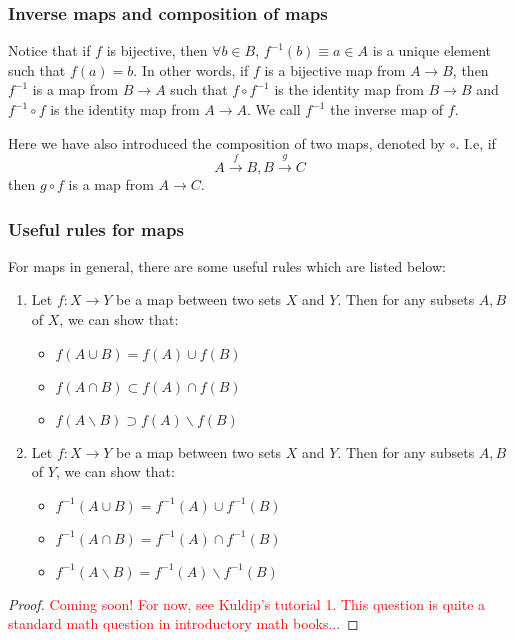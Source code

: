         \subsubsection*{Inverse maps and composition of maps}
          Notice that if $f$ is bijective, then $\forall b \in B$, $f^{-1}(b)
          \equiv a \in A$ is a unique element such that $f(a) = b$. In other
          words, if $f$ is a bijective map from $A \rightarrow B$, then
          $f^{-1}$ is a map from $B \rightarrow A$ such that $f \circ f^{-1}$
          is the identity map from $B \rightarrow B$ and $f^{-1} \circ f$ is
          the identity map from $A \rightarrow A$. We call $f^{-1}$ the inverse
          map of $f$.

          Here we have also introduced the composition of two maps, denoted
          by $\circ$. I.e, if \[A \xrightarrow{f} B, B \xrightarrow{g} C\]
          then $g \circ f$ is a map from $A \rightarrow C$.
        \subsubsection*{Useful rules for maps}
          For maps in general, there are some useful rules which are listed below:
          \begin{enumerate}
            \item{Let $f: X\rightarrow Y$ be a map between two sets $X$ and
            $Y$. Then for any subsets $A,B$ of $X$, we can show that:
            \begin{itemize}
              \item{$f(A \cup B) = f(A) \cup f(B)$}
              \item{$f(A \cap B) \subset f(A) \cap f(B)$}
              \item{$f(A \backslash B) \supset f(A) \backslash f(B)$}
            \end{itemize}}
            \item{Let $f: X\rightarrow Y$ be a map between two sets $X$ and
            $Y$. Then for any subsets $A,B$ of $Y$, we can show that:
            \begin{itemize}
              \item{$f^{-1}(A \cup B) = f^{-1}(A) \cup f^{-1}(B)$}
              \item{$f^{-1}(A \cap B) = f^{-1}(A) \cap f^{-1}(B)$}
              \item{$f^{-1}(A \backslash B) = f^{-1}(A) \backslash f^{-1}(B)$}
            \end{itemize}}
          \end{enumerate}
          \begin{proof}
            \textcolor{red}{Coming soon! For now, see Kuldip's tutorial 1.
            This question is quite a standard math question in introductory
            math books...}
          \end{proof}
